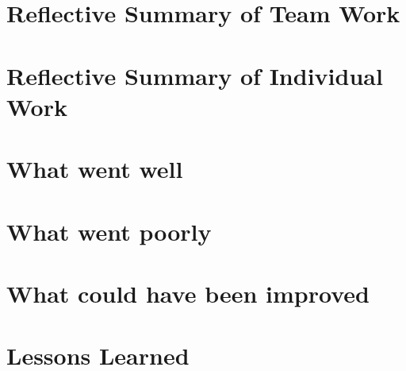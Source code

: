 \section{Reflective Summary of Team Work}
\section{Reflective Summary of Individual Work}
\section{What went well}
\section{What went poorly}
\section{What could have been improved}
\section{Lessons Learned}
